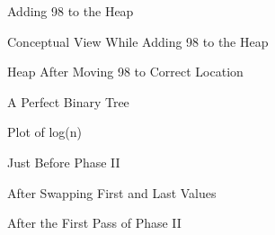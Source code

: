\documentclass[letterpaper,10pt,english]{sphinxmanual}
\begin{document}
\begin{figure}[htbp]
\centering
\capstart

\noindent{}
\caption{Adding 98 to the Heap}\label{\detokenize{chap8/chap8:id7}}\end{figure}

\begin{figure}[htbp]
\centering
\capstart

\noindent{}
\caption{Conceptual View While Adding 98 to the Heap}\label{\detokenize{chap8/chap8:id8}}\end{figure}

\begin{figure}[htbp]
\centering
\capstart

\noindent{}
\caption{Heap After Moving 98 to Correct Location}\label{\detokenize{chap8/chap8:id9}}\end{figure}

\begin{figure}[htbp]
\centering
\capstart

\noindent{}
\caption{A Perfect Binary Tree}\label{\detokenize{chap8/chap8:id10}}\end{figure}

\begin{figure}[htbp]
\centering
\capstart

\noindent{}
\caption{Plot of log(n)}\label{\detokenize{chap8/chap8:id11}}\end{figure}

\begin{figure}[htbp]
\centering
\capstart

\noindent{}
\caption{Just Before Phase II}\label{\detokenize{chap8/chap8:id12}}\end{figure}

\begin{figure}[htbp]
\centering
\capstart

\noindent{}
\caption{After Swapping First and Last Values}\label{\detokenize{chap8/chap8:id13}}\end{figure}

\begin{figure}[htbp]
\centering
\capstart

\noindent{}
\caption{After the First Pass of Phase II}\label{\detokenize{chap8/chap8:id14}}\end{figure}
\end{document}
